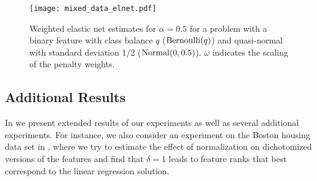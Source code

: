 \begin{figure}[htpb]
  \centering
  \texttt{[image: mixed\_data\_elnet.pdf]}
  \caption{%
    Weighted elastic net estimates for \(\alpha = 0.5\) for a problem with a binary
    feature with class balance \(q\) (\(\operatorname{Bernoulli}(q)\)) and quasi-normal
    with standard deviation 1/2 (\(\operatorname{Normal}(0, 0.5)\)). \(\omega\) indicates
    the scaling of the penalty weights.
  }
  \label{fig:mixed-data-elnet}
\end{figure}

\subsection{Additional Results}

In  we present extended results of our experiments as well
as several additional experiments. For instance, we also consider an experiment on the
Boston housing data set in , where we try to estimate the effect
of normalization on dichotomized versions of the features and find that \(\delta = 1\)
leads to feature ranks that best correspond to the linear regression solution.
